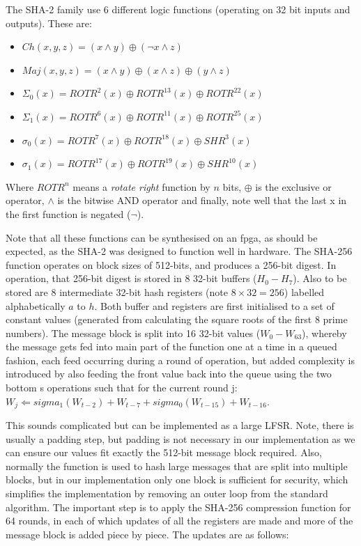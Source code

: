 The SHA-2 family use 6 different logic functions (operating on 32 bit inputs
and outputs). These are:

\begin{itemize}
	\item $Ch(x, y, z)  = (x \wedge y) \oplus (\neg x \wedge z)$
	\item $Maj(x, y, z) = (x \wedge y) \oplus (x \wedge z) \oplus (y \wedge z)$
	\item $\Sigma_{0}(x) = ROTR^{ 2}(x) \oplus ROTR^{13}(x) \oplus ROTR^{22}(x)$
	\item $\Sigma_{1}(x) = ROTR^{ 6}(x) \oplus ROTR^{11}(x) \oplus ROTR^{25}(x)$
	\item $\sigma_{0}(x) = ROTR^{ 7}(x) \oplus ROTR^{18}(x) \oplus  SHR^{ 3}(x)$
	\item $\sigma_{1}(x) = ROTR^{17}(x) \oplus ROTR^{19}(x) \oplus  SHR^{10}(x)$
\end{itemize}

Where $ROTR^{n}$ means a \emph{rotate right} function by $n$ bits, $\oplus$ is
the exclusive or operator, $\wedge$ is the bitwise AND operator and finally,
note well that the last x in the first function is negated ($\neg$).

Note that all these functions can be synthesised on an \gls{fpga}, as should be
expected, as the SHA-2 was designed to function well in hardware.
The SHA-256 function operates on block sizes of 512-bits, and produces a
256-bit digest.
In operation, that 256-bit digest is stored in 8 32-bit buffers
($H_{0} - H_{7}$).
Also to be stored are 8 intermediate 32-bit hash registers 
(note $8 \times 32 = 256$) labelled alphabetically $a$ to $h$.
Both buffer and registers are first initialised to a set of constant values
(generated from calculating the square roots of the first 8 prime numbers).
The message block is split into 16 32-bit values ($W_{0} - W_{63}$), whereby the
message gets fed into main part of the function one at a time in a queued
fashion, each feed occurring during a round of operation,
but added complexity is introduced by also feeding the front value back into
the queue using the two bottom s operations such that for the current round
j:
$W_{j} \Leftarrow sigma_{1}(W_{t-2} )+ W_{t-7}  + sigma_{0}(W_{t-15}) + W_{t-16}$.

This sounds complicated but can be implemented as a large LFSR.
Note, there is usually a padding step, but padding is not necessary in our
implementation as we can ensure our values fit exactly the
512-bit message block required.
Also, normally the function is used to hash large messages that are split into
multiple blocks, but in our implementation only one block is sufficient for
security, which simplifies the implementation by removing an outer loop from the
standard algorithm.
The important step is to apply the SHA-256 compression function for 64 rounds,
in each of which updates of all the registers are made and more of the message
block is added piece by piece. The updates are as follows:

